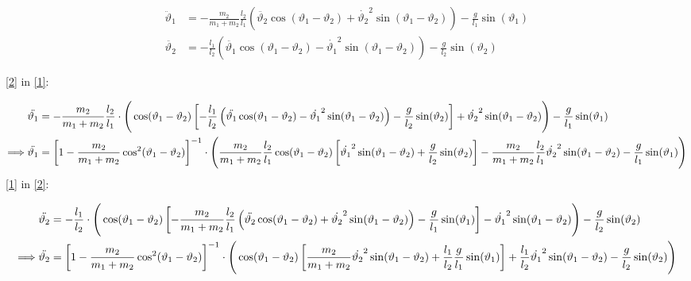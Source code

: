 \documentclass[preview,a4paper,8pt]{standalone}
\begin{document}
\begin{align*}
\ddot{\vartheta}_1 &= -\frac{m_2}{m_1+m_2}\frac{l_2}{l_1}\left(\ddot{\vartheta_2}\cos(\vartheta_1-\vartheta_2)+\dot{\vartheta_2}^2\sin(\vartheta_1-\vartheta_2)\right)- \frac{g}{l_1}\sin(\vartheta_1) \label{1}\\
\ddot{\vartheta_2} &= -\frac{l_1}{l_2}\left(\ddot{\vartheta_1}\cos(\vartheta_1-\vartheta_2) - \dot{\vartheta_1}^2\sin(\vartheta_1-\vartheta_2)\right)-\frac{g}{l_2}\sin(\vartheta_2) \label{2}
\end{align*}

\eqref{2} in \eqref{1}:

\begin{align*}
\ddot{\vartheta_1} &=
-\frac{m_2}{m_1+m_2}\frac{l_2}{l_1}\cdot
\Bigg(
\cos(\vartheta_1-\vartheta_2)
\left[
-\frac{l_1}{l_2}\left(\ddot{\vartheta_1}\cos(\vartheta_1-\vartheta_2) - \dot{\vartheta_1}^2\sin(\vartheta_1-\vartheta_2)\right)-\frac{g}{l_2}\sin(\vartheta_2)
\right]
+\dot{\vartheta_2}^2\sin(\vartheta_1-\vartheta_2)
\Bigg)
-\frac{g}{l_1}\sin(\vartheta_1)
\nonumber\hfill \\
\Longrightarrow \ddot{\vartheta_1} &= \left[1-\frac{m_2}{m_1+m_2}\cos^2(\vartheta_1-\vartheta_2)\right]^{-1}\cdot
\Bigg(
\frac{m_2}{m_1+m_2}\frac{l_2}{l_1}\cos(\vartheta_1-\vartheta_2)
\left[\dot{\vartheta_1}^2\sin(\vartheta_1-\vartheta_2)
+\frac{g}{l_2}\sin(\vartheta_2)
\right] 
- \frac{m_2}{m_1+m_2}\frac{l_2}{l_1}\dot{\vartheta_2}^2\sin(\vartheta_1-\vartheta_2)
- \frac{g}{l_1}\sin(\vartheta_1)
\Bigg)
\end{align*}
\eqref{1} in \eqref{2}:

\begin{align*}
\ddot{\vartheta_2} &=
-\frac{l_1}{l_2}\cdot
\Bigg(
\cos(\vartheta_1-\vartheta_2)\left[-\frac{m_2}{m_1+m_2}\frac{l_2}{l_1}\left(\ddot{\vartheta_2}\cos(\vartheta_1-\vartheta_2)+\dot{\vartheta_2}^2\sin(\vartheta_1-\vartheta_2)\right)- \frac{g}{l_1}\sin(\vartheta_1)\right]
-\dot{\vartheta_1}^2\sin(\vartheta_1-\vartheta_2)
\Bigg)
-\frac{g}{l_2}\sin(\vartheta_2)\nonumber
\hfill\\
\Longrightarrow \ddot{\vartheta_2} &= \left[1-\frac{m_2}{m_1+m_2}\cos^2(\vartheta_1-\vartheta_2)\right]^{-1}\cdot
\Bigg(
\cos(\vartheta_1-\vartheta_2)\left[\frac{m_2}{m_1+m_2}\dot{\vartheta_2}^2\sin(\vartheta_1-\vartheta_2)+\frac{l_1}{l_2}\frac{g}{l_1}\sin(\vartheta_1)\right] + \frac{l_1}{l_2}\dot{\vartheta_1}^2\sin(\vartheta_1-\vartheta_2)
-\frac{g}{l_2}\sin(\vartheta_2)
\Bigg)
\end{align*}
\end{document}
